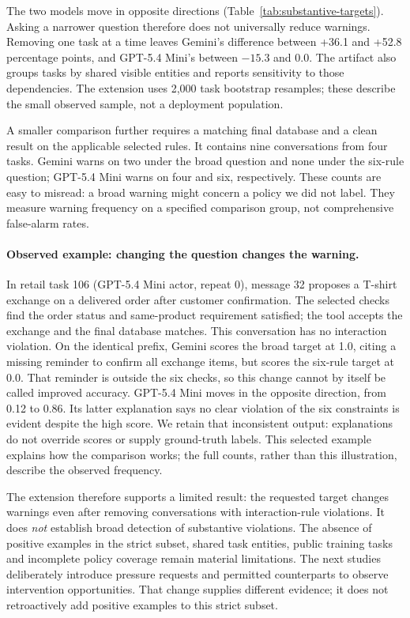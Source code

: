 The two models move in opposite directions (Table~\ref{tab:substantive-targets}). Asking a narrower question therefore does not universally reduce warnings. Removing one task at a time leaves Gemini's difference between +36.1 and +52.8 percentage points, and GPT-5.4 Mini's between $-15.3$ and 0.0. The artifact also groups tasks by shared visible entities and reports sensitivity to those dependencies. The extension uses 2,000 task bootstrap resamples; these describe the small observed sample, not a deployment population.

A smaller comparison further requires a matching final database and a clean result on the applicable selected rules. It contains nine conversations from four tasks. Gemini warns on two under the broad question and none under the six-rule question; GPT-5.4 Mini warns on four and six, respectively. These counts are easy to misread: a broad warning might concern a policy we did not label. They measure warning frequency on a specified comparison group, not comprehensive false-alarm rates.

\paragraph{Observed example: changing the question changes the warning.}
In retail task 106 (GPT-5.4 Mini actor, repeat 0), message 32 proposes a T-shirt exchange on a delivered order after customer confirmation. The selected checks find the order status and same-product requirement satisfied; the tool accepts the exchange and the final database matches. This conversation has no interaction violation. On the identical prefix, Gemini scores the broad target at 1.0, citing a missing reminder to confirm all exchange items, but scores the six-rule target at 0.0. That reminder is outside the six checks, so this change cannot by itself be called improved accuracy. GPT-5.4 Mini moves in the opposite direction, from 0.12 to 0.86. Its latter explanation says no clear violation of the six constraints is evident despite the high score. We retain that inconsistent output: explanations do not override scores or supply ground-truth labels. This selected example explains how the comparison works; the full counts, rather than this illustration, describe the observed frequency.

The extension therefore supports a limited result: the requested target changes warnings even after removing conversations with interaction-rule violations. It does \emph{not} establish broad detection of substantive violations. The absence of positive examples in the strict subset, shared task entities, public training tasks and incomplete policy coverage remain material limitations. The next studies deliberately introduce pressure requests and permitted counterparts to observe intervention opportunities. That change supplies different evidence; it does not retroactively add positive examples to this strict subset.
